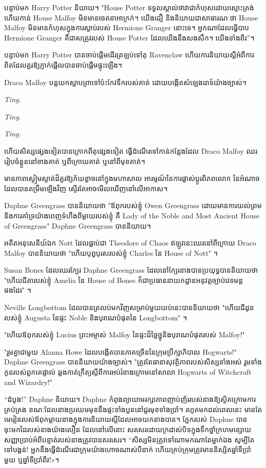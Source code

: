 បន្ទាប់មក Harry Potter និយាយ។ "House Potter ទទួល​ស្គាល់​ថា​វា​ជា​កំហុស​ដោយ​ស្មោះ​ត្រង់ ហើយ​កាន់ House Malfoy មិន​មាន​ចេតនា​អាក្រក់។ យើងជឿ និងនិយាយជាសាធារណៈថា House Malfoy មិនមានកំហុសក្នុងការស្លាប់របស់ Hermione Granger នោះទេ។ អ្នកណាដែលធ្វើបាប Hermione Granger គឺជាសត្រូវរបស់ House Potter ដែលយើងនឹងសងសឹក។ យើងទាំងពីរ”។

បន្ទាប់មក Harry Potter បានចាប់ផ្តើមដើរត្រឡប់ទៅតុ Ravenclaw ហើយការនិយាយស្តីអំពីការពិតដែលគួរឱ្យភ្ញាក់ផ្អើលបានចាប់ផ្តើមផ្ទុះឡើង។

Draco Malfoy បន្ត​យក​ស្លាបព្រា​ទៅ​ប៉ះ​កែវ​ទឹក​របស់​គាត់ ដោយ​បង្កើត​សំឡេង​រោទ៍​យ៉ាង​ច្បាស់។

\emph{Ting.}

\emph{Ting.}

\emph{Ting.}

ហើយសិស្សផ្សេងទៀតបានក្រោកពីតុផ្សេងទៀត ធ្វើដំណើរទៅកាន់កន្លែងដែល Draco Malfoy ឈរ រៀបចំខ្លួននៅខាងគាត់ ឬពីក្រោយគាត់ ឬនៅពីមុខគាត់។

មានភាពស្ងៀមស្ងាត់ដ៏គួរឱ្យភ័យខ្លាចនៅក្នុងមហាសាល អារម្មណ៍នៃការផ្លាស់ប្តូរពិភពលោក នៃអំណាចដែលបានតម្រឹមឡើងវិញ ស្ទើរតែអាចមើលឃើញនៅលើអាកាស។

Daphne Greengrass បាននិយាយថា "ឪពុករបស់ខ្ញុំ Owen Greengrass ដោយមានការយល់ព្រម និងការគាំទ្រយ៉ាងពេញទំហឹងពីម្តាយរបស់ខ្ញុំ គឺ Lady of the Noble and Most Ancient House of Greengrass" Daphne Greengrass បាននិយាយ។

អតីតអនុសេនីយ៍ឯក Nott ដែលធ្លាប់ជា Theodore of Chaos ឥឡូវនេះឈរនៅពីក្រោយ Draco Malfoy បាននិយាយថា "ហើយបុព្វបុរសរបស់ខ្ញុំ Charles នៃ House of Nott" ។

Susan Bones ដែលឈរក្បែរ Daphne Greengrass ដែលនៅក្បែរនាងបានប្រយុទ្ធបាននិយាយថា "ហើយជីតារបស់ខ្ញុំ Amelia នៃ House of Bones ក៏ជាប្រធាននាយកដ្ឋានអនុវត្តច្បាប់វេទមន្តផងដែរ" ។

Neville Longbottom ដែលបានត្រលប់មកវិញសម្រាប់មួយយប់នេះបាននិយាយថា "ហើយជីដូនរបស់ខ្ញុំ Augusta នៃផ្ទះ Noble និងបុរាណបំផុតនៃ Longbottom" ។

"ហើយឪពុករបស់ខ្ញុំ Lucius ព្រះអម្ចាស់ Malfoy នៃផ្ទះដ៏ថ្លៃថ្នូនិងបុរាណបំផុតរបស់ Malfoy!"

"រួមគ្នាជាមួយ Alanna Howe ដែលបង្កើតបានភាគច្រើននៃក្រុមប្រឹក្សាភិបាល Hogwarts!" Daphne Greengrass បាននិយាយយ៉ាងច្បាស់។ "ត្រូវតែធានាសុវត្ថិភាពរបស់សិស្សទាំងអស់ រួមទាំងកូនរបស់ពួកគេផ្ទាល់ ឆ្លងកាត់ក្រឹត្យស្តីពីការអប់រំខាងក្រោមនៅសាលា Hogwarts of Witchcraft and Wizardry!"

\later

“ដំបូង!” Daphne និយាយ។ Daphne កំពុងព្យាយាមរក្សាភាពញាប់ញ័ររបស់នាងឱ្យស្ថិតក្រោមការគ្រប់គ្រង ខណៈដែលនាងប្រឈមមុខនឹងផ្ទះទាំងបួននៅជួរមុខទាំងប្រាំ។ រហូតមកដល់ពេលនេះ មានតែមេរៀនរបស់ឪពុកម្តាយនាងក្នុងការនិយាយស្តីដែលអាចយកនាងបាន។ ភ្នែករបស់ Daphne បានចុះមកដៃរបស់នាងយ៉ាងលឿន ដែលនៅលើនោះ សរសេរដោយក្រដាស់បិទក្នុងទឹកថ្នាំក្រហមខ្សោយ សញ្ញាប្រាប់អំពីបន្ទាត់របស់នាងត្រូវបានសរសេរ។ “សិស្សមិនត្រូវទៅណាមកណាតែម្នាក់ឯង សូម្បីតែទៅបង្គន់! អ្នក​នឹង​ធ្វើ​ដំណើរ​ជា​ក្រុម​យ៉ាង​ហោច​ណាស់​បី​នាក់ ហើយ​គ្រប់​ក្រុម​ត្រូវ​មាន​និស្សិត​ឆ្នាំ​ទី​ប្រាំមួយ ឬ​ឆ្នាំ​ទី​ប្រាំពីរ!»។

